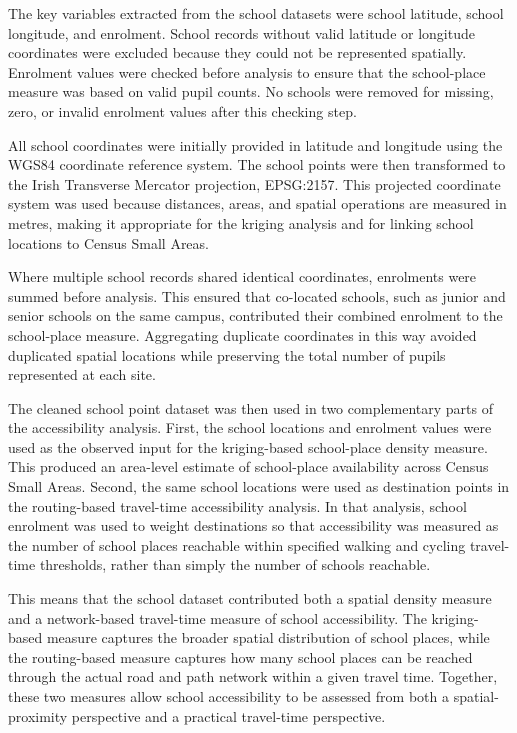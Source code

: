 \documentclass{article}
\begin{document}
The key variables extracted from the school datasets were school
latitude, school longitude, and enrolment. School records without valid
latitude or longitude coordinates were excluded because they could not
be represented spatially. Enrolment values were checked before analysis
to ensure that the school-place measure was based on valid pupil counts.
No schools were removed for missing, zero, or invalid enrolment values
after this checking step.

All school coordinates were initially provided in latitude and longitude
using the WGS84 coordinate reference system. The school points were then
transformed to the Irish Transverse Mercator projection, EPSG:2157. This
projected coordinate system was used because distances, areas, and
spatial operations are measured in metres, making it appropriate for the
kriging analysis and for linking school locations to Census Small Areas.

Where multiple school records shared identical coordinates, enrolments
were summed before analysis. This ensured that co-located schools, such
as junior and senior schools on the same campus, contributed their
combined enrolment to the school-place measure. Aggregating duplicate
coordinates in this way avoided duplicated spatial locations while
preserving the total number of pupils represented at each site.

The cleaned school point dataset was then used in two complementary
parts of the accessibility analysis. First, the school locations and
enrolment values were used as the observed input for the kriging-based
school-place density measure. This produced an area-level estimate of
school-place availability across Census Small Areas. Second, the same
school locations were used as destination points in the routing-based
travel-time accessibility analysis. In that analysis, school enrolment
was used to weight destinations so that accessibility was measured as
the number of school places reachable within specified walking and
cycling travel-time thresholds, rather than simply the number of schools
reachable.

This means that the school dataset contributed both a spatial density
measure and a network-based travel-time measure of school accessibility.
The kriging-based measure captures the broader spatial distribution of
school places, while the routing-based measure captures how many school
places can be reached through the actual road and path network within a
given travel time. Together, these two measures allow school
accessibility to be assessed from both a spatial-proximity perspective
and a practical travel-time perspective.
\end{document}
